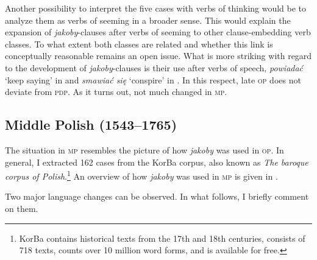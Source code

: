 \documentclass[output=paper]{langsci/langscibook}
\begin{document}
\z
Another possibility to interpret the five cases with verbs of thinking would be to analyze them as verbs of seeming in a broader sense. This would explain the expansion of \emph{jakoby}-clauses after verbs of seeming to other clause-embedding verb classes. To what extent both classes are related and whether this link is conceptually reasonable remains an open issue. What is more striking with regard to the development of \emph{jakoby}-clauses is their use after verbs of speech, \emph{powiadać} `keep saying' in  and \emph{smawiać się} `conspire' in . In this respect, late \textsc{op} does not deviate from \textsc{pdp}. As it turns out, not much changed in \textsc{mp}.

\subsection{Middle Polish (1543--1765)}

The situation in \textsc{mp} resembles the picture of how \emph{jakoby} was used in \textsc{op}. In general, I extracted 162 cases from the KorBa corpus, also known as \emph{The baroque corpus of Polish}.\footnote{KorBa contains historical texts from the 17th and 18th centuries, consists of 718 texts, counts over 10 million word forms, and is available for free.
}
An overview of how \emph{jakoby} was used in \textsc{mp} is given in .\largerpage[2]

\begin{table}[h]
\caption{The use of \emph{jakoby} in the KorBa corpus} \label{mlodopolski_statystka}
\end{table}

\noindent  Two major language changes can be observed. In what follows, I briefly comment on them.
\end{document}
